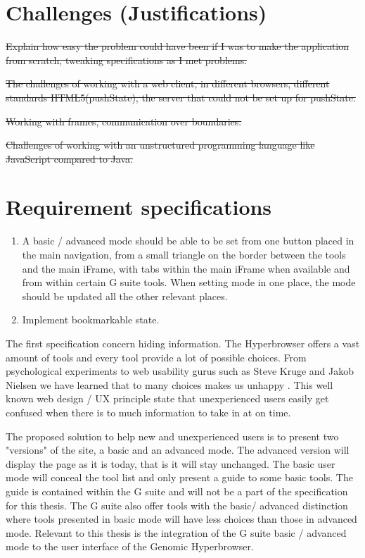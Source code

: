 \documentclass[english]{ifimaster}
\begin{document}
\section{Challenges (Justifications)}
\sout{Explain how easy the problem could have been if I was to make the application from scratch, tweaking specifications as I met problems.}

\sout{The challenges of working with a web client, in different browsers, different standards HTML5(pushState), the server that could not be set up for pushState.}

\sout{Working with frames, communication over boundaries.}

\sout{Challenges of working with an unstructured programming language like JavaScript compared to Java.}

\section{Requirement specifications}
\begin{enumerate}
\item A basic / advanced mode should be able to be set from one button placed in the main navigation, from a small triangle on the border between the tools and the main iFrame, with tabs within the main iFrame when available and from within certain G suite tools. When setting mode in one place, the mode should be updated all the other relevant places.

\item Implement bookmarkable state.

\end{enumerate}

The first specification concern hiding information. The Hyperbrowser offers a vast amount of tools and every tool provide a lot of possible choices. From psychological experiments to web usability gurus such as Steve Kruge and Jakob Nielsen we have learned that to many choices makes us unhappy\parencite{schwartz2004paradox} \parencite{krug2005don} \parencite{nielsen1997user}. This well known web design / UX principle state that unexperienced users easily get confused when there is to much information to take in at on time.

The proposed solution to help new and unexperienced users is to present two "versions" of the site, a basic and an advanced mode. The advanced version will display the page as it is today, that is it will stay unchanged. The basic user mode will conceal the tool list and only present a guide to some basic tools. The guide is contained within the G suite and will not be a part of the specification for this thesis. The G suite also offer tools with the basic/ advanced distinction where tools presented in basic mode will have less choices than those in advanced mode. 
Relevant to this thesis is the integration of the G suite basic / advanced mode to the user interface of the Genomic Hyperbrowser. 
\end{document}
